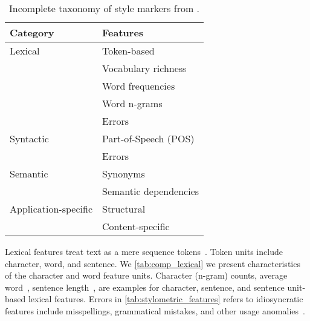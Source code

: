 \begin{table}[]
    \centering
    \caption{Incomplete taxonomy of style markers from \citep{stamatatos_survey_2009}.}
    \label{tab:stylometric_features}
 
    \begin{tabular}{@{}ll@{}} %
    \toprule
    \textbf{Category} & \textbf{Features} \\ 
    \midrule
    Lexical & Token-based \\ %
     & Vocabulary richness  \\
     & Word frequencies  \\
     & Word n-grams  \\
     & Errors \\
    Syntactic & Part-of-Speech (POS)  \\
     & Errors  \\
    Semantic & Synonyms \\
     & Semantic dependencies \\
    Application-specific & Structural  \\
     & Content-specific\\
     \bottomrule
    \end{tabular}%

\end{table}

Lexical features treat text as a mere sequence tokens~\citep{stamatatos_survey_2009}.
Token units include character, word, and sentence.
We \autoref{tab:comp_lexical} we present characteristics of the character and word feature units.
Character (n-gram) counts, average word~\citep{stein_intrinsic_2011}, sentence length~\citep{stein_intrinsic_2011,abbasi_writeprints_2008}, are examples for character, sentence, and sentence unit-based lexical features.
Errors in \autoref{tab:stylometric_features} refers to idiosyncratic features include misspellings, grammatical mistakes, and other usage anomalies~\citep{abbasi_writeprints_2008,neal_surveying_2018}.


